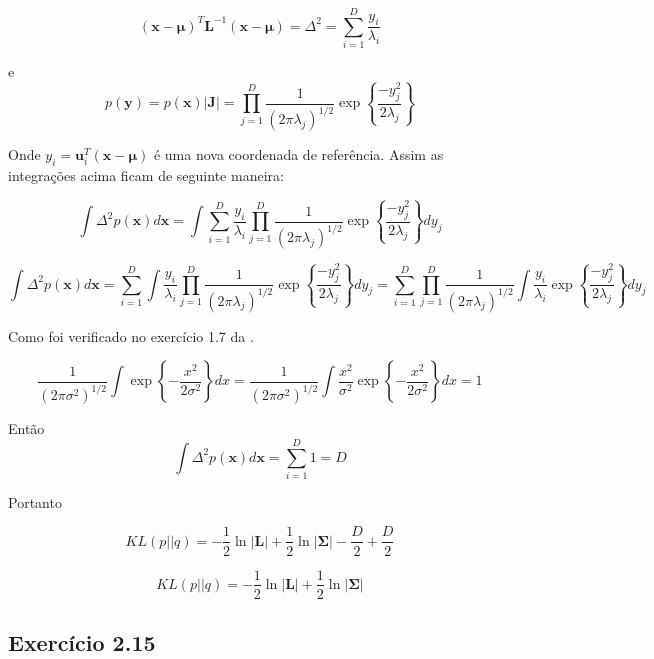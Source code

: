 \documentclass{article}
\begin{document}
\begin{itemize}
   	  \[
   	    (\mathbf{x}-\boldsymbol{\mu})^{T} \mathbf{L}^{-1}(\mathbf{x}-\boldsymbol{\mu}) = \varDelta^{2} = \sum_{i=1}^{D} \frac{y_{i}}{\lambda_{i}}
   	  \] 
   	  
   	  e
   	  \[
   	     p(\mathbf{y})=p(\textbf{x})|\mathbf{J}| = \prod_{j=1}^{D} \frac{1}{(2 \pi \lambda_{j})^{1/2}} \exp \left\{ \frac{-y^{2}_{j}}{2 \lambda_{j}} \right\}
   	  \]
   	  
   	  Onde $y_{i} = \mathbf{u}_{i}^{T}(\mathbf{x}-\boldsymbol{\mu})$ é uma nova coordenada de referência. Assim as integrações acima ficam de seguinte maneira:
   	  
   	  \[
   	   \int \varDelta^{2} p(\textbf{x}) d\textbf{x} = \int \sum_{i=1}^{D} \frac{y_{i}}{\lambda_{i}}\prod_{j=1}^{D} \frac{1}{(2 \pi \lambda_{j})^{1/2}} \exp \left\{ \frac{-y^{2}_{j}}{2 \lambda_{j}} \right\} d y_{j}
   	  \]
   	  
   	  \[
   	    \int \varDelta^{2} p(\textbf{x}) d\textbf{x} = \sum_{i=1}^{D} \int  \frac{y_{i}}{\lambda_{i}}\prod_{j=1}^{D} \frac{1}{(2 \pi \lambda_{j})^{1/2}} \exp \left\{ \frac{-y^{2}_{j}}{2 \lambda_{j}} \right\} d y_{j} = \sum_{i=1}^{D} \prod_{j=1}^{D} \frac{1}{(2 \pi \lambda_{j})^{1/2}} \int \frac{y_{i}}{\lambda_{i}} \exp \left\{ \frac{-y^{2}_{j}}{2 \lambda_{j}} \right\} d y_{j}
   	  \]
   	  
   	  Como foi verificado no exercício 1.7 da \cite{lista1}.
   	  
   	  \[
   	    \frac{1}{(2 \pi \sigma^{2})^{1/2}} \int \exp \left\{ -\frac{x^{2}}{2 \sigma^2} \right\} dx =  \frac{1}{(2 \pi \sigma^{2})^{1/2}} \int  \frac{x^{2}}{\sigma^{2}} \exp \left\{ -\frac{x^{2}}{2 \sigma^2} \right\} dx = 1
   	  \]
   	
   	 Então
   	  \[
   	    \int \varDelta^{2} p(\textbf{x}) d\textbf{x} =  \sum_{i=1}^{D} 1 = D
   	  \]
   \end{itemize}
   
    Portanto 
    
    
    \[
      KL(p || q) = - \frac{1}{2} \ln{|\mathbf{L}|} + \frac{1}{2} \ln{|\boldsymbol{\Sigma}|} -\frac{D}{2} + \frac{D}{2}
    \]
     
     
     \[
     KL(p || q) = - \frac{1}{2} \ln{|\mathbf{L}|} + \frac{1}{2} \ln{|\boldsymbol{\Sigma}|} 
     \]
    
  
\subsection{ Exerc\'icio 2.15}
 
\end{document}
